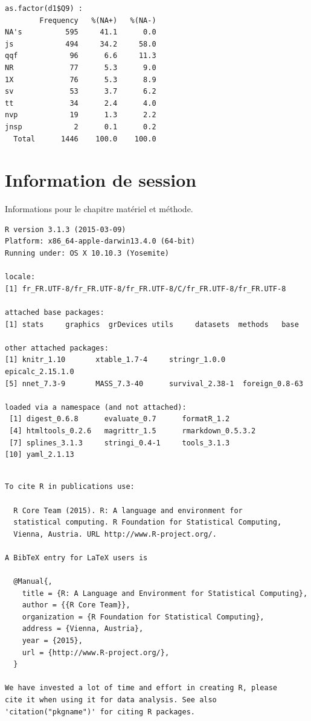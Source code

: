 \documentclass[]{article}
\begin{document}
\begin{verbatim}
as.factor(d1$Q9) : 
        Frequency   %(NA+)   %(NA-)
NA's          595     41.1      0.0
js            494     34.2     58.0
qqf            96      6.6     11.3
NR             77      5.3      9.0
1X             76      5.3      8.9
sv             53      3.7      6.2
tt             34      2.4      4.0
nvp            19      1.3      2.2
jnsp            2      0.1      0.2
  Total      1446    100.0    100.0
\end{verbatim}

\section{Information de session}\label{information-de-session}

Informations pour le chapitre matériel et méthode.

\begin{verbatim}
R version 3.1.3 (2015-03-09)
Platform: x86_64-apple-darwin13.4.0 (64-bit)
Running under: OS X 10.10.3 (Yosemite)

locale:
[1] fr_FR.UTF-8/fr_FR.UTF-8/fr_FR.UTF-8/C/fr_FR.UTF-8/fr_FR.UTF-8

attached base packages:
[1] stats     graphics  grDevices utils     datasets  methods   base     

other attached packages:
[1] knitr_1.10       xtable_1.7-4     stringr_1.0.0    epicalc_2.15.1.0
[5] nnet_7.3-9       MASS_7.3-40      survival_2.38-1  foreign_0.8-63  

loaded via a namespace (and not attached):
 [1] digest_0.6.8      evaluate_0.7      formatR_1.2      
 [4] htmltools_0.2.6   magrittr_1.5      rmarkdown_0.5.3.2
 [7] splines_3.1.3     stringi_0.4-1     tools_3.1.3      
[10] yaml_2.1.13      
\end{verbatim}

\begin{verbatim}

To cite R in publications use:

  R Core Team (2015). R: A language and environment for
  statistical computing. R Foundation for Statistical Computing,
  Vienna, Austria. URL http://www.R-project.org/.

A BibTeX entry for LaTeX users is

  @Manual{,
    title = {R: A Language and Environment for Statistical Computing},
    author = {{R Core Team}},
    organization = {R Foundation for Statistical Computing},
    address = {Vienna, Austria},
    year = {2015},
    url = {http://www.R-project.org/},
  }

We have invested a lot of time and effort in creating R, please
cite it when using it for data analysis. See also
'citation("pkgname")' for citing R packages.
\end{verbatim}
\end{document}

